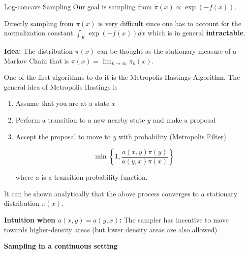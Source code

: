 \documentclass{beamer}
\begin{document}
\begin{frame}[allowframebreaks]{Log-concave Sampling}
    Our goal is sampling from $\pi(x) \propto \exp(-f(x))$. 
    
    \medskip
    
    Directly sampling from $\pi(x)$ is very difficult since one has to account for the normalization constant $\int_K \exp(-f(x)) d x$ which is in general \textbf{intractable}. 
    
    \medskip
    
    \textbf{Idea:} The distribution $\pi(x)$ can be thought as the stationary measure of a Markov Chain that is $\pi(x) = \lim_{k \to \infty} \pi_k(x)$. 

    \framebreak
    
    One of the first algorithms to do it is the Metropolis-Hastings Algorithm. The general idea of Metropolis Hastings is 
    
    \begin{enumerate}
        \item Assume that you are at a state $x$ 
        \item Perform a transition to a new nearby state $y$ and make a proposal
        \item Accept the proposal to move to $y$ with probability (Metropolis Filter)
        
        $$\min \left  \{ 1, \frac { a (x, y) \pi(y) } {a (y, x) \pi (x)} \right \}$$
        
        where $a$ is a transition probability function. 
        
    \end{enumerate}
    
    It can be shown analytically that the above process converges to a stationary distribution $\pi(x)$.
    
    \textbf{Intuition when $a(x,y) = a(y,x)$:} The sampler has incentive to move towards higher-density areas (but lower density areas are also allowed)
    
\end{frame}

\begin{frame}
    \vfill 
    \centering
    \Large
    \textbf{Sampling in a continuous setting}
    \vfill
\end{frame}
\end{document}

